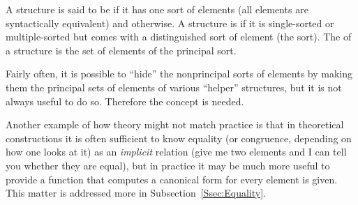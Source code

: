 \documentclass{mtmtcl}
\theoremstyle{plain}
\theoremstyle{remark}
\begin{document}
\begin{definition}
  A structure is said to be  if it has one sort 
  of elements (all elements are syntactically equivalent) and 
   otherwise. A structure is 
   if it is single-sorted or multiple-sorted but 
  comes with a distinguished sort of element (the  
  sort). The  of a structure is 
  the set of elements of the principal sort.
\end{definition}

Fairly often, it is possible to ``hide'' the nonprincipal sorts of 
elements by making them the principal sets of elements of various 
``helper'' structures, but it is not always useful to do so. 
Therefore the concept is needed.

Another example of how theory might not match practice is that in 
theoretical constructions it is often sufficient to know equality (or 
congruence, depending on how one looks at it) as an \emph{implicit} 
relation (give me two elements and I can tell you whether they are 
equal), but in practice it may be much more useful to provide a 
function that computes a canonical form for every element is given. 
This matter is addressed more in Subsection~\ref{Ssec:Equality}.
\end{document}

